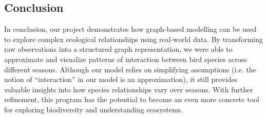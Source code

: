 \documentclass{article}
\begin{document}
\subsection*{Conclusion}
In conclusion, our project demonstrates how graph-based modelling can be used to explore complex ecological relationships using real-world data. By transforming raw observations into a structured graph representation, we were able to approximate and visualize patterns of interaction between bird species across different seasons. Although our model relies on simplifying assumptions (i.e. the notion of “interaction” in our model is an approximation), it still provides valuable insights into how species relationships vary over seasons. With further refinement, this program has the potential to become an even more concrete tool for exploring biodiversity and understanding ecosystems. \\ \\ \\ 
\end{document}
